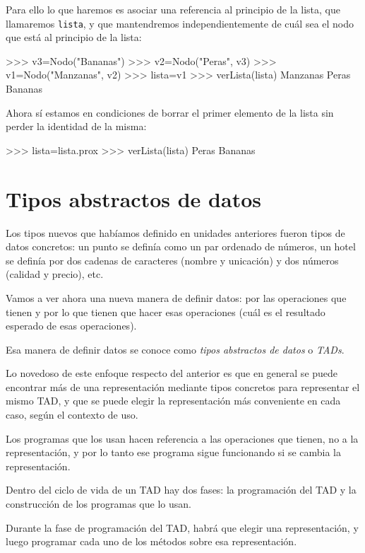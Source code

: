 Para ello lo que haremos es asociar una referencia al principio de la lista,
que llamaremos \lstinline|lista|, y que mantendremos independientemente de cuál sea
el nodo que está al principio de la lista:

\begin{codigo-python-sn}
>>> v3=Nodo("Bananas")
>>> v2=Nodo("Peras", v3)
>>> v1=Nodo("Manzanas", v2)
>>> lista=v1
>>> verLista(lista)
Manzanas
Peras
Bananas
\end{codigo-python-sn}

Ahora sí estamos en condiciones de borrar el primer elemento de la lista
sin perder la identidad de la misma:

\begin{codigo-python-sn}
>>> lista=lista.prox
>>> verLista(lista)
Peras
Bananas
\end{codigo-python-sn}

\section{Tipos abstractos de datos}

Los tipos nuevos que habíamos definido en unidades anteriores fueron tipos de
datos concretos: un punto se definía como un par ordenado de números, un hotel
se definía por dos cadenas de caracteres (nombre y unicación) y dos números
(calidad y precio), etc.

Vamos a ver ahora una nueva manera de definir datos: por las
operaciones que tienen y por lo que tienen que hacer esas
operaciones (cuál es el resultado esperado de esas operaciones).

Esa manera de definir datos se conoce como {\it tipos abstractos de datos} o
{\it TADs}.

Lo novedoso de este enfoque respecto del anterior es que en general se puede
encontrar más de una representación mediante tipos concretos para representar
el mismo TAD, y que se puede elegir la representación más conveniente en cada
caso, según el contexto de uso.

Los programas que los usan hacen referencia a las operaciones que tienen, no a
la representación, y por lo tanto ese programa sigue funcionando si se cambia
la representación.

Dentro del ciclo de vida de un TAD hay dos fases: la programación del TAD y
la construcción de los programas que lo usan.

Durante la fase de programación del TAD, habrá que elegir una
representación, y luego programar cada uno de los métodos sobre esa
representación.


